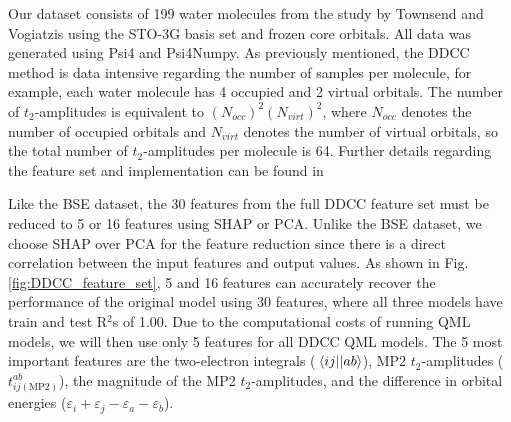 \documentclass[journal=jacsat,manuscript=article]{achemso}
\begin{document}
Our dataset consists of 199 water molecules from the study by Townsend and Vogiatzis using the STO-3G basis set\cite{hehre_selfconsistent_1970} and frozen core orbitals.
All data was generated using Psi4\cite{parrish_psi4_2017} and Psi4Numpy\cite{smith_psi4numpy_2018}.
As previously mentioned, the DDCC method is data intensive regarding the number of samples per molecule, for example, each water molecule has 4 occupied and 2 virtual orbitals.
The number of $t_{2}$-amplitudes is equivalent to $(N_{occ})^{2}(N_{virt})^{2}$, where $N_{occ}$ denotes the number of occupied orbitals and $N_{virt}$ denotes the number of virtual orbitals, so the total number of $t_{2}$-amplitudes per molecule is 64.
Further details regarding the feature set and implementation can be found in \cite{townsend_data-driven_2019}

Like the BSE dataset, the 30 features from the full DDCC feature set must be reduced to 5 or 16 features using SHAP or PCA.
Unlike the BSE dataset, we choose SHAP over PCA for the feature reduction since there is a direct correlation between the input features and output values.
As shown in Fig. \ref{fig:DDCC_feature_set}, 5 and 16 features can accurately recover the performance of the original model using 30 features, where all three models have train and test R$^{2}$s of 1.00.
Due to the computational costs of running QML models, we will then use only 5 features for all DDCC QML models.
The 5 most important features are the two-electron integrals ($\mel{ij}{}{ab}$), MP2 $t_{2}$-amplitudes ($t^{ab}_{ij(\text{MP2})}$), the magnitude of the MP2 $t_{2}$-amplitudes, and the difference in orbital energies ($\varepsilon_{i}+\varepsilon_{j}-\varepsilon_{a}-\varepsilon_{b}$).
\end{document}
